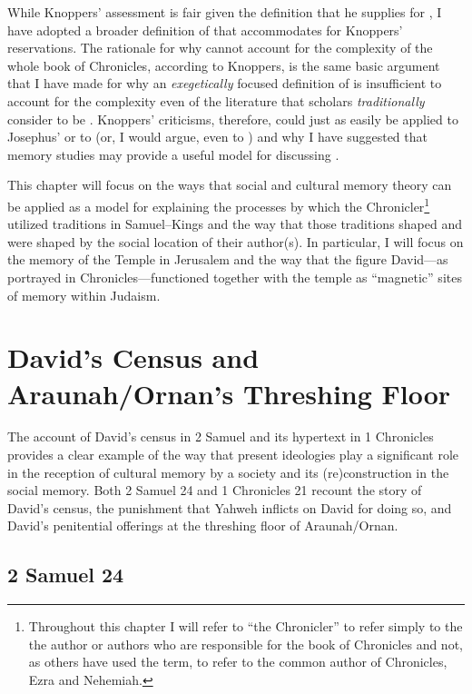  While Knoppers' assessment is fair given the definition that he supplies for \rwb, I have adopted a broader definition of \rwb that accommodates for Knoppers' reservations. The rationale for why \rwb cannot account for the complexity of the whole book of Chronicles, according to Knoppers, is the same basic argument that I have made for why an \emph{exegetically} focused definition of \rwb is insufficient to account for the complexity even of the literature that scholars \emph{traditionally} consider to be \rwb. Knoppers' criticisms, therefore, could just as easily be applied to Josephus' \ant or to \jub (or, I would argue, even to \ga) and why I have suggested that memory studies may provide a useful model for discussing \rwb. 

 This chapter will focus on the ways that social and cultural memory theory can be applied as a model for explaining the processes by which the Chronicler\footnote{Throughout this chapter I will refer to ``the   Chronicler'' to refer simply to the the author or authors who are   responsible for the book of Chronicles and not, as others have used   the term, to refer to the common author of Chronicles, Ezra and   Nehemiah.} utilized traditions in Samuel--Kings and the way that those traditions shaped and were shaped by the social location of their author(s). In particular, I will focus on the memory of the Temple in Jerusalem and the way that the figure David---as portrayed in Chronicles---functioned together with the temple as ``magnetic'' sites of memory within \secondtemple Judaism.\autocite[73]{benzvi_st2017} 

 \hypertarget{davids-census-and-araunahornans-threshing-floor}{%
 \section{David's Census and Araunah/Ornan's Threshing Floor}\label{davids-census-and-araunahornans-threshing-floor}} 

 The account of David's census in 2 Samuel and its hypertext in 1 Chronicles provides a clear example of the way that present ideologies play a significant role in the reception of cultural memory by a society and its (re)construction in the social memory. Both 2 Samuel 24 and 1 Chronicles 21 recount the story of David's census, the punishment that Yahweh inflicts on David for doing so, and David's penitential offerings at the threshing floor of Araunah/Ornan. 

 \hypertarget{samuel-24}{%
 \subsection{2 Samuel 24}\label{samuel-24}} 

